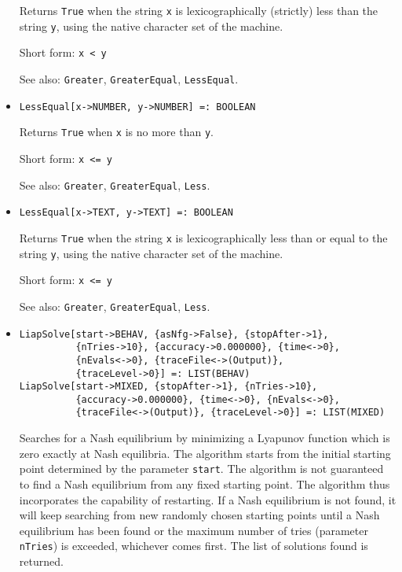 \begin{itemize}
\bd
Returns \verb+True+ when the string \verb+x+ is lexicographically (strictly)
less than
the string \verb+y+, using the native character set of the machine.
\item [Short form:] \verb+x < y+
\item [See also:] \verb+Greater+, \verb+GreaterEqual+, \verb+LessEqual+.
\ed

\item{}
\protect \large \begin{verbatim}
LessEqual[x->NUMBER, y->NUMBER] =: BOOLEAN 
\end{verbatim}\normalsize

\bd
Returns \verb+True+ when \verb+x+ is no more than \verb+y+.
\item [Short form:] \verb+x <= y+
\item [See also:] \verb+Greater+, \verb+GreaterEqual+, \verb+Less+.
\ed

\item{}
\protect \large \begin{verbatim}
LessEqual[x->TEXT, y->TEXT] =: BOOLEAN 
\end{verbatim}\normalsize

\bd
Returns \verb+True+ when the string \verb+x+ is lexicographically less than
or equal to the string \verb+y+, using the native character set of the machine.
\item [Short form:] \verb+x <= y+
\item [See also:] \verb+Greater+, \verb+GreaterEqual+, \verb+Less+.
\ed

\item{}
\protect \large \begin{verbatim}
LiapSolve[start->BEHAV, {asNfg->False}, {stopAfter->1}, 
          {nTries->10}, {accuracy->0.000000}, {time<->0}, 
          {nEvals<->0}, {traceFile<->(Output)}, 
          {traceLevel->0}] =: LIST(BEHAV)
LiapSolve[start->MIXED, {stopAfter->1}, {nTries->10}, 
          {accuracy->0.000000}, {time<->0}, {nEvals<->0}, 
          {traceFile<->(Output)}, {traceLevel->0}] =: LIST(MIXED)
\end{verbatim}\normalsize


\bd 
Searches for a Nash equilibrium by minimizing a Lyapunov function
which is zero exactly at Nash equilibria.  The algorithm starts from
the initial starting point determined by the parameter \verb+start+.
The algorithm is not guaranteed to find a Nash equilibrium from any
fixed starting point.  The algorithm thus incorporates the capability
of restarting.  If a Nash equilibrium is not found, it will keep
searching from new randomly chosen starting points until a Nash
equilibrium has been found or the maximum number of tries (parameter
\verb+nTries+) is exceeded, whichever comes first.  The list of
solutions found is returned.


\end{itemize}
